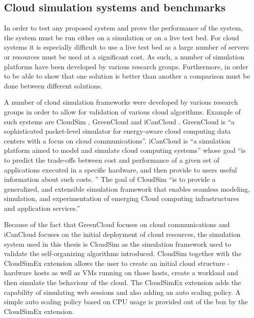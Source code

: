 \subsection{Cloud simulation systems and benchmarks}

In order to test any proposed system and prove the performance of the system, the system must be run either on a simulation or on a live test bed. For cloud systems it is especially difficult to use a live test bed as a large number of servers or resources must be used at a significant cost. As such, a number of simulation platforms have been developed by various research groups. Furthermore, in order to be able to show that one solution is better than another a comparison must be done between different solutions.

A number of cloud simulation frameworks were developed by various research groups in order to allow for validation of various cloud algorithms. Example of such systems are CloudSim \cite{related:cloudsim}, GreenCloud \cite{related:greencloud} and iCanCloud \cite{related:icancloud}. GreenCloud is ``a sophisticated packet-level simulator for energy-aware cloud computing data centers with a focus on cloud communications''. iCanCloud is ``a simulation platform aimed to model and simulate cloud computing systems'' whose goal ``is to predict the trade-offs between cost and performance of a given set of applications executed in a specific hardware, and then provide to users useful information about such costs. '' The goal of CloudSim ``is to provide a generalized, and extensible simulation framework that enables seamless modeling, simulation, and experimentation of emerging Cloud computing infrastructures and application services.''

Because of the fact that GreenCloud focuses on cloud communications and iCanCloud focuses on the initial deployment of cloud resources, the simulation system used in this thesis is CloudSim as the simulation framework used to validate the self-organizing algorithms introduced. CloudSim together with the CloudSimEx extension allows the user to create an initial cloud structure - hardware hosts as well as VMs running on those hosts, create a workload and then simulate the behaviour of the cloud. The CloudSimEx extension adds the capability of simulating web sessions and also adding an auto scaling policy. A simple auto scaling policy based on CPU usage is provided out of the box by the CloudSimEx extension.

